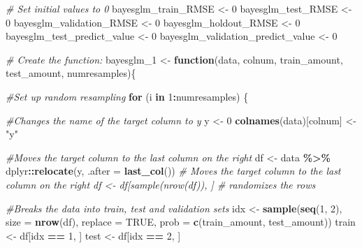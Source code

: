 \documentclass[
]{book}
\newenvironment{Shaded}{\begin{snugshade}}{\end{snugshade}}
\newcommand{\AttributeTok}[1]{\textcolor[rgb]{0.13,0.29,0.53}{#1}}
\newcommand{\CommentTok}[1]{\textcolor[rgb]{0.56,0.35,0.01}{\textit{#1}}}
\newcommand{\ConstantTok}[1]{\textcolor[rgb]{0.56,0.35,0.01}{#1}}
\newcommand{\ControlFlowTok}[1]{\textcolor[rgb]{0.13,0.29,0.53}{\textbf{#1}}}
\newcommand{\DecValTok}[1]{\textcolor[rgb]{0.00,0.00,0.81}{#1}}
\newcommand{\FunctionTok}[1]{\textcolor[rgb]{0.13,0.29,0.53}{\textbf{#1}}}
\newcommand{\NormalTok}[1]{#1}
\newcommand{\OtherTok}[1]{\textcolor[rgb]{0.56,0.35,0.01}{#1}}
\newcommand{\SpecialCharTok}[1]{\textcolor[rgb]{0.81,0.36,0.00}{\textbf{#1}}}
\newcommand{\StringTok}[1]{\textcolor[rgb]{0.31,0.60,0.02}{#1}}
\begin{document}
\begin{Shaded}
\begin{Highlighting}[]

\CommentTok{\# Set initial values to 0}
\NormalTok{bayesglm\_train\_RMSE }\OtherTok{\textless{}{-}} \DecValTok{0}
\NormalTok{bayesglm\_test\_RMSE }\OtherTok{\textless{}{-}} \DecValTok{0}
\NormalTok{bayesglm\_validation\_RMSE }\OtherTok{\textless{}{-}} \DecValTok{0}
\NormalTok{bayesglm\_holdout\_RMSE }\OtherTok{\textless{}{-}} \DecValTok{0}
\NormalTok{bayesglm\_test\_predict\_value }\OtherTok{\textless{}{-}} \DecValTok{0}
\NormalTok{bayesglm\_validation\_predict\_value }\OtherTok{\textless{}{-}} \DecValTok{0}

\CommentTok{\# Create the function:}
\NormalTok{bayesglm\_1 }\OtherTok{\textless{}{-}} \ControlFlowTok{function}\NormalTok{(data, colnum, train\_amount, test\_amount, numresamples)\{}

\CommentTok{\#Set up random resampling}
\ControlFlowTok{for}\NormalTok{ (i }\ControlFlowTok{in} \DecValTok{1}\SpecialCharTok{:}\NormalTok{numresamples) \{}

\CommentTok{\#Changes the name of the target column to y}
\NormalTok{y }\OtherTok{\textless{}{-}} \DecValTok{0}
\FunctionTok{colnames}\NormalTok{(data)[colnum] }\OtherTok{\textless{}{-}} \StringTok{"y"}

\CommentTok{\#Moves the target column to the last column on the right}
\NormalTok{df }\OtherTok{\textless{}{-}}\NormalTok{ data }\SpecialCharTok{\%\textgreater{}\%}\NormalTok{ dplyr}\SpecialCharTok{::}\FunctionTok{relocate}\NormalTok{(y, }\AttributeTok{.after =} \FunctionTok{last\_col}\NormalTok{()) }\CommentTok{\# Moves the target column to the last column on the right df \textless{}{-} df[sample(nrow(df)), ] \# randomizes the rows}

\CommentTok{\#Breaks the data into train, test and validation sets}
\NormalTok{idx }\OtherTok{\textless{}{-}} \FunctionTok{sample}\NormalTok{(}\FunctionTok{seq}\NormalTok{(}\DecValTok{1}\NormalTok{, }\DecValTok{2}\NormalTok{), }\AttributeTok{size =} \FunctionTok{nrow}\NormalTok{(df), }\AttributeTok{replace =} \ConstantTok{TRUE}\NormalTok{, }\AttributeTok{prob =} \FunctionTok{c}\NormalTok{(train\_amount, test\_amount))}
\NormalTok{train }\OtherTok{\textless{}{-}}\NormalTok{ df[idx }\SpecialCharTok{==} \DecValTok{1}\NormalTok{, ]}
\NormalTok{test }\OtherTok{\textless{}{-}}\NormalTok{ df[idx }\SpecialCharTok{==} \DecValTok{2}\NormalTok{, ]}


\end{Highlighting}
\end{Shaded}
\end{document}
